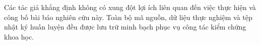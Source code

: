 \documentclass{llncs}
\begin{document}
\begin{credits}
\subsubsection*{\discintname}
Các tác giả khẳng định không có xung đột lợi ích liên quan đến việc thực hiện và công bố bài báo nghiên cứu này. Toàn bộ mã nguồn, dữ liệu thực nghiệm và tệp nhật ký huấn luyện đều được lưu trữ minh bạch phục vụ công tác kiểm chứng khoa học.
\end{credits}



\end{document}
